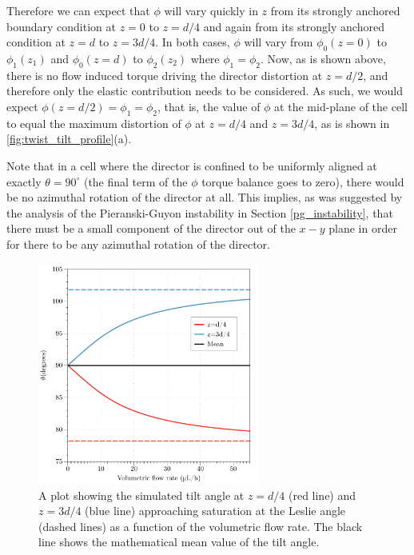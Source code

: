 Therefore we can expect that $\phi$ will vary quickly in $z$ from its strongly anchored boundary condition at $z=0$ to $z=d/4$ and again from its strongly anchored condition at $z=d$ to $z=3d/4$. In both cases, $\phi$ will vary from $\phi_0\left(z=0\right)$ to $\phi_1\left(z_1\right)$ and $\phi_0\left(z=d\right)$ to $\phi_2\left(z_2\right)$ where $\phi_1=\phi_2$. Now, as is shown above, there is no flow induced torque driving the director distortion at $z=d/2$, and therefore only the elastic contribution needs to be considered. As such, we would expect $\phi\left(z=d/2\right)=\phi_1=\phi_2$, that is, the value of $\phi$ at the mid-plane of the cell to equal the maximum distortion of $\phi$ at $z=d/4$ and $z=3d/4$, as is shown in \ref{fig:twist_tilt_profile}(a).

Note that in a cell where the director is confined to be uniformly aligned at exactly $\theta=90^{\circ}$ (the final term of the $\phi$ torque balance goes to zero), there would be no azimuthal rotation of the director at all. This implies, as was suggested by the analysis of the Pieranski-Guyon instability in Section \ref{pg_instability}, that there must be a small component of the director out of the $x-y$ plane in order for there to be any azimuthal rotation of the director.

\begin{figure}
\begin{center}
\includegraphics[width=0.65\textwidth]{Figures/45/leslie_angle}
\end{center}
\caption[Simulated tilt angle of the director saturating at $\theta_l$ at $z=d/4$ and $z=3d/4$]{\label{fig:leslie_angle}A plot showing the simulated tilt angle at $z=d/4$ (red line) and $z=3d/4$ (blue line) approaching saturation at the Leslie angle (dashed lines) as a function of the volumetric flow rate. The black line shows the mathematical mean value of the tilt angle.}
\end{figure}

